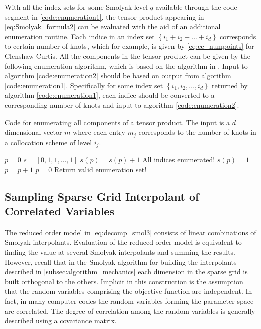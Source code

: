 With all the index sets for some Smolyak level $q$ available through the code segment in \ref{code:enumeration1}, the tensor product appearing in \ref{eq:Smolyak_formula2} can be evaluated with the aid of an additional enumeration routine. Each indice in an index set $\left\{i_1+i_2+...+i_d\right\}$ corresponds to certain number of knots, which for example, is given by \ref{eq:cc_numpoints} for Clenshaw-Curtis. All the components in the tensor product can be given by the following enumeration algorithm, which is based on the algorithm in \cite{Holtz}. Input to algorithm \ref{code:enumeration2} should be based on output from algorithm \ref{code:enumeration1}. Specifically for some index set $\left\{i_1,i_2,...,i_d\right\}$ returned by algorithm \ref{code:enumeration1}, each indice should be converted to a corresponding number of knots and input to algorithm \ref{code:enumeration2}.     
\begin{algorithm}
\caption{\label{code:enumeration2} 
Code for enumerating all components of a tensor product. The input is a $d$ dimensional vector $m$ where each entry $m_j$ corresponds to the number of knots in a collocation scheme of level $i_j$.} 
\begin{algorithmic}[1]
\State $p = 0$
\State $s = \left[0,1,1,...,1\right]$  
\Repeat 
   \State $s(p) = s(p) + 1$
         \State All indices enumerated!
      \Else
         \State $s(p) = 1$
         \State $p = p + 1$
      \EndIf
   \Else
      \State $p = 0$
      \State Return valid enumeration set!
   \EndIf
{} 
\end{algorithmic}
\end{algorithm}

\subsection{Sampling Sparse Grid Interpolant of Correlated Variables} \label{subsec:sampling_smolyak}

The reduced order model in \ref{eq:decomp_smol3} consists of linear combinations of Smolyak interpolants. Evaluation of the reduced order model is equivalent to finding the value at several Smolyak interpolants and summing the results. However, recall that in the Smolyak algorithm for building the interpolants described in \ref{subsec:algorithm_mechanics} each dimension in the sparse grid is built orthogonal to the others. Implicit in this construction is the assumption that the random variables comprising the objective function are independent. In fact, in many computer codes the random variables forming the parameter space are correlated. The degree of correlation among the random variables is generally described using a covariance matrix. 

